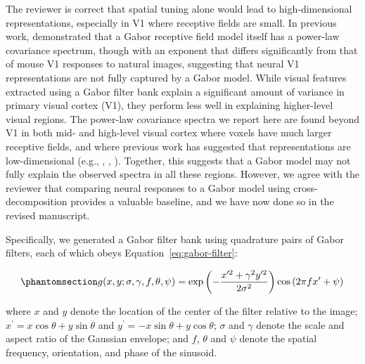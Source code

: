 \documentclass[10pt]{article}
\begin{document}
The reviewer is correct that spatial tuning alone would lead to high-dimensional representations, especially in V1 where receptive fields are small. In previous work, \textcite{Stringer2019} demonstrated that a Gabor receptive field model itself has a power-law covariance spectrum, though with an exponent that differs significantly from that of mouse V1 responses to natural images, suggesting that neural V1 representations are not fully captured by a Gabor model. While visual features extracted using a Gabor filter bank explain a significant amount of variance in primary visual cortex (V1), they perform less well in explaining higher-level visual regions. The power-law covariance spectra we report here are found beyond V1 in both mid- and high-level visual cortex where voxels have much larger receptive fields, and where previous work has suggested that representations are low-dimensional (e.g., \textcite{Fusi2016}, \textcite{Lehky2014}, \textcite{Lehky2016}). Together, this suggests that a Gabor model may not fully explain the observed spectra in all these regions. However, we agree with the reviewer that comparing neural responses to a Gabor model using cross-decomposition provides a valuable baseline, and we have now done so in the revised manuscript.

Specifically, we generated a Gabor filter bank using quadrature pairs of Gabor filters, each of which obeys Equation~\ref{eq:gabor-filter}:

\begin{equation}\phantomsection\label{eq:gabor-filter}{
g(x, y; \sigma, \gamma, f, \theta, \psi) = \exp{\left(- \frac{x^{\prime 2} + \gamma^2 y^{\prime 2}}{2 \sigma^2}\right)} \cos{\left(2 \pi f x^\prime + \psi\right)}\,
}\end{equation}

where \(x\) and \(y\) denote the location of the center of the filter relative to the image; \(x^\prime = x \cos \theta + y \sin \theta\) and \(y^\prime = - x \sin \theta + y \cos \theta\); \(\sigma\) and \(\gamma\) denote the scale and aspect ratio of the Gaussian envelope; and \(f\), \(\theta\) and \(\psi\) denote the spatial frequency, orientation, and phase of the sinusoid.
\end{document}

